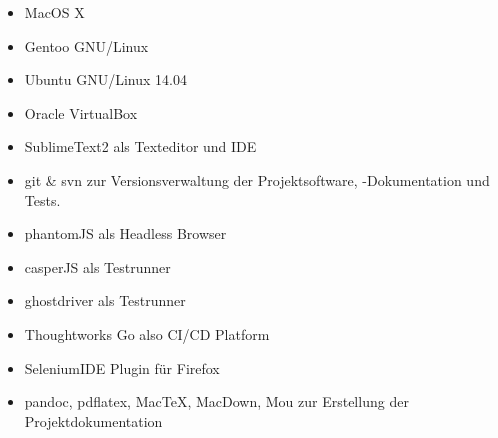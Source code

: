 \begin{itemize}
\itemsep1pt\parskip0pt
\item
  MacOS X
\item
  Gentoo GNU/Linux
\item
  Ubuntu GNU/Linux 14.04
\item
  Oracle VirtualBox
\item
  SublimeText2 als Texteditor und \acs{IDE}
\item
  git \& svn zur Versionsverwaltung der Projektsoftware, -Dokumentation
  und Tests.
\item
  phantomJS als Headless Browser
\item
  casperJS als Testrunner
\item
  ghostdriver als Testrunner
\item
  Thoughtworks Go also CI/CD Platform
\item
  SeleniumIDE Plugin für Firefox
\item
  pandoc, pdflatex, MacTeX, MacDown, Mou zur Erstellung der
  Projektdokumentation
\end{itemize}

% 
% 
% 
% 

% 


% 
